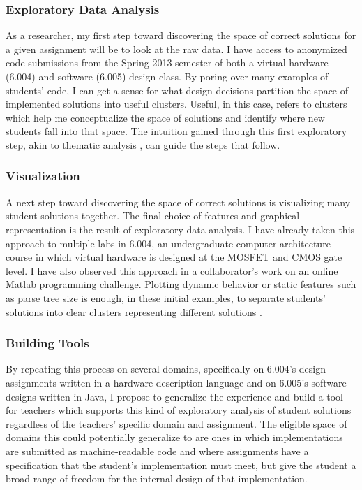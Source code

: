 \documentclass[12pt]{article}
\begin{document}
\subsubsection{Exploratory Data Analysis}

As a researcher, my first step toward discovering the space of correct solutions for a given assignment will be to look at the raw data. I have access to anonymized code submissions from the Spring 2013 semester of both a virtual hardware (6.004) and software (6.005) design class. By poring over many examples of students' code, I can get a sense for what design decisions partition the space of implemented solutions into useful clusters. Useful, in this case, refers to clusters which help me conceptualize the space of solutions and identify where new students fall into that space. The intuition gained through this first exploratory step, akin to thematic analysis \cite{thematic06}, can guide the steps that follow.

\subsubsection{Visualization}

A next step toward discovering the space of correct solutions is visualizing many student solutions together. The final choice of features and graphical representation is the result of exploratory data analysis. I have already taken this approach to multiple labs in 6.004, an undergraduate computer architecture course in which virtual hardware is designed at the MOSFET and CMOS gate level. I have also observed this approach in a collaborator's work on an online Matlab programming challenge. Plotting dynamic behavior or static features such as parse tree size is enough, in these initial examples, to separate students' solutions into clear clusters representing different solutions \cite{ICERGlassman}.

\subsubsection{Building Tools}

By repeating this process on several domains, specifically on 6.004's design assignments written in a hardware description language and on 6.005's software designs written in Java, I propose to generalize the experience and build a tool for teachers which supports this kind of exploratory analysis of student solutions regardless of the teachers' specific domain and assignment. The eligible space of domains this could potentially generalize to are ones in which implementations are submitted as machine-readable code and where assignments have a specification that the student's implementation must meet, but give the student a broad range of freedom for the internal design of that implementation.
\end{document}
